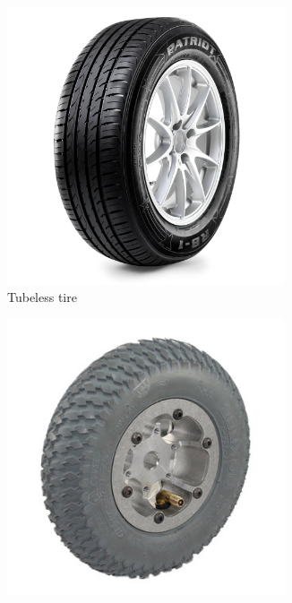 	\begin{figure}[H]
		\begin{subfigure}[b]{.19\linewidth}
			\includegraphics[width=0.9\textwidth]{imgs/tire_radial.jpeg}
			\caption{Tubeless tire}
		\end{subfigure}\begin{subfigure}[b]{.19\linewidth}
			\includegraphics[width=0.9\textwidth]{imgs/tire_tubed.jpeg}

\end{subfigure}
\end{figure}
